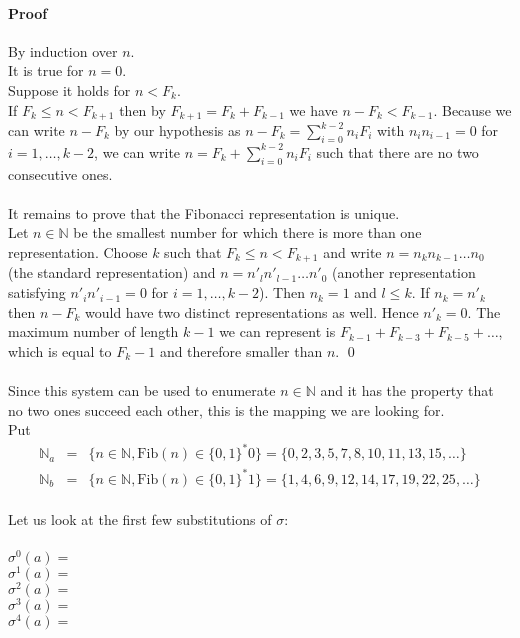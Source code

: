 \documentclass{article}
\begin{document}
\paragraph{Proof} By induction over $n$.\\
It is true for $n = 0$.\\
Suppose it holds for $n < F_k$.\\
If $F_k \le n < F_{k + 1}$ then by $F_{k + 1} = F_k + F_{k - 1}$ we have 
$n - F_k < F_{k - 1}$. Because we can write $n - F_k$ by our hypothesis as
$n - F_k = \sum_{i = 0}^{k - 2} n_i F_i$ with $n_i n_{i - 1} = 0$ for
$i = 1, \ldots, k - 2$, we can write $n = F_k + \sum_{i = 0}^{k - 2} n_i F_i$ 
such that there are no two consecutive ones.\\
\\
It remains to prove that the Fibonacci representation is unique.\\
Let $n \in \mathbb{N}$ be the smallest number for which there is more than one
representation. Choose $k$ such that $F_k \le n < F_{k + 1}$ and write
$n = n_k n_{k - 1} \ldots n_0$ (the standard representation) and
$n = n'_l n'_{l - 1} \ldots n'_0$ (another representation satisfying 
$n'_i n'_{i - 1} = 0$ for $i = 1, \ldots, k - 2$). Then $n_k = 1$ and $l \le k$.
If $n_k = n'_k$ then $n - F_k$ would have two distinct representations as well.
Hence $n'_k = 0$.
The maximum number of length $k - 1$ we can represent is 
$F_{k - 1} + F_{k - 3} + F_{k - 5} + \ldots$, which is equal to $F_k - 1$ and 
therefore smaller than $n$. \qed\\
\\
Since this system can be used to enumerate $n \in \mathbb{N}$ and it has the
property that no two ones succeed each other, this is the mapping we are
looking for.\\
Put
\begin{eqnarray*}
  \mathbb{N}_a &=& \{n \in \mathbb{N}, \mathrm{Fib}(n) \in \{0, 1\}^* 0\} = 
                   \{0, 2, 3, 5, 7, 8, 10, 11, 13, 15, \ldots\}\\
  \mathbb{N}_b &=& \{n \in \mathbb{N}, \mathrm{Fib}(n) \in \{0, 1\}^* 1\} =
                   \{1, 4, 6, 9, 12, 14, 17, 19, 22, 25, \ldots\}
\end{eqnarray*}
\\
Let us look at the first few substitutions of $\sigma$:\\
\\
$\sigma^0(a) =$ \\
$\sigma^1(a) =$ \\
$\sigma^2(a) =$ \\
$\sigma^3(a) =$ \\
$\sigma^4(a) =$ 
\end{document}
